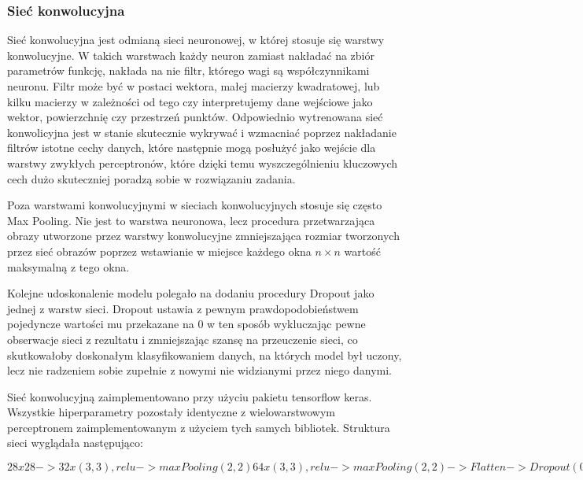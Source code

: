 \documentclass{article}
\begin{document}
\subsubsection{Sieć konwolucyjna}
Sieć konwolucyjna jest odmianą sieci neuronowej, w której stosuje się warstwy konwolucyjne. W takich warstwach każdy neuron zamiast nakładać na zbiór parametrów funkcję, nakłada na nie filtr, którego wagi są współczynnikami neuronu. Filtr może być w postaci wektora, małej macierzy kwadratowej, lub kilku macierzy w zależności od tego czy interpretujemy dane wejściowe jako wektor, powierzchnię czy przestrzeń punktów. Odpowiednio wytrenowana sieć konwolicyjna jest w stanie skutecznie wykrywać i wzmacniać poprzez nakładanie filtrów istotne cechy danych, które następnie mogą posłużyć jako wejście dla warstwy zwykłych perceptronów, które dzięki temu wyszczególnieniu kluczowych cech dużo skuteczniej poradzą sobie w rozwiązaniu zadania.

Poza warstwami konwolucyjnymi w sieciach konwolucyjnych stosuje się często Max Pooling. Nie jest to warstwa neuronowa, lecz procedura przetwarzająca obrazy utworzone przez warstwy konwolucyjne zmniejszająca rozmiar tworzonych przez sieć obrazów poprzez wstawianie w miejsce każdego okna $n \times n$ wartość maksymalną z tego okna.

Kolejne udoskonalenie modelu polegało na dodaniu procedury Dropout jako jednej z warstw sieci. Dropout ustawia z pewnym prawdopodobieństwem pojedyncze wartości mu przekazane na 0 w ten sposób wykluczając pewne obserwacje sieci z rezultatu i zmniejszając szansę na przeuczenie sieci, co skutkowałoby doskonałym klasyfikowaniem danych, na których model był uczony, lecz nie radzeniem sobie zupełnie z nowymi nie widzianymi przez niego danymi.

Sieć konwolucyjną zaimplementowano przy użyciu pakietu tensorflow keras. Wszystkie hiperparametry pozostały identyczne z wielowarstwowym perceptronem zaimplementowanym z użyciem tych samych bibliotek. Struktura sieci wyglądała następująco:




$28x28-> 32x(3,3), relu -> maxPooling(2,2) 64x(3,3), relu -> maxPooling(2,2)->Flatten->Dropout(0.5) -> 10, softmax$
\end{document}
